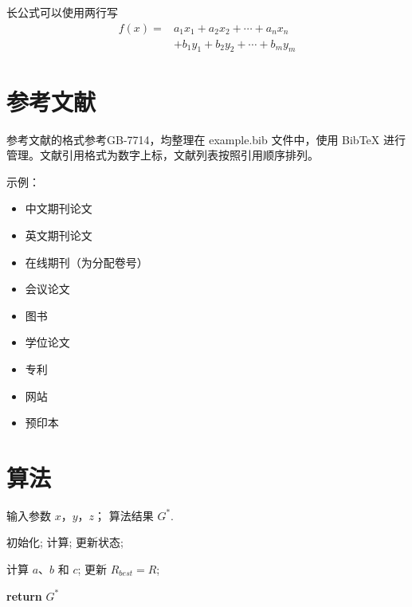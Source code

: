 长公式可以使用两行写
\begin{equation}
\begin{aligned}
f(x) = & a_1 x_1 + a_2 x_2 + \cdots + a_n x_n \\
& + b_1 y_1 + b_2 y_2 + \cdots + b_m y_m
\end{aligned}
\end{equation}

\section{参考文献}
参考文献的格式参考GB-7714，均整理在 example.bib 文件中，使用 BibTeX 进行管理。文献引用格式为数字上标，文献列表按照引用顺序排列。

示例：
\begin{itemize}
    \item 中文期刊论文 \cite{RN1202}
    \item 英文期刊论文 \cite{RN2}
    \item 在线期刊（为分配卷号） \cite{RN1217}
    \item 会议论文 \cite{RN146}
    \item 图书 \cite{book2}
    \item 学位论文 \cite{RN1204}
    \item 专利 \cite{RN1206}
    \item 网站 \cite{kuiper}
    \item 预印本 \cite{megatron}
\end{itemize}


\section{算法}

\begin{algorithm}[htbp!]
  \small
  \caption{XXX 算法 }
  \label{alg:3-1}
  \renewcommand{\algorithmicrequire}{\textbf{输入:}}
  \renewcommand{\algorithmicensure}{\textbf{输出:}}
  \begin{algorithmic}[1]
  \Require 输入参数 $x$，$y$，$z$；
  \Ensure 算法结果 $G^*$.
  
  \State 初始化;
  \State 计算;
     \State 更新状态;
    
  \EndFor
  \State 计算 $a$、$b$ 和 $c$;
        \State 更新 $R_{best} = R$;
  \EndIf

  \State \textbf{return} $G^*$
\end{algorithmic}
\end{algorithm}